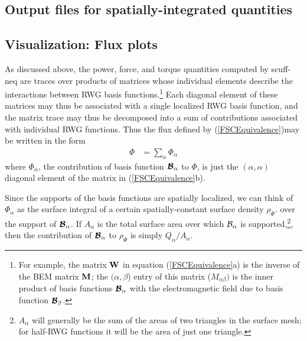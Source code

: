 \documentclass[letterpaper]{article}
\begin{document}
\newpage
\subsection{Output files for spatially-integrated quantities}

\subsection{Visualization: Flux plots}

As discussed above, the power, force, and torque quantities
computed by {\sc scuff-neq} are traces over products of matrices
whose individual elements describe the interactions between
RWG basis functions.\footnote{For example, the matrix $\mathbf{W}$ 
in equation (\ref{FSCEquivalence}a) is the inverse of the BEM matrix 
$\mathbf{M}$; the $(\alpha,\beta$) entry of this matrix 
($M_{\alpha\beta})$ is the inner product of basis functions 
$\boldsymbol{\mathcal{B}}_\alpha$ with the electromagnetic field due to basis
function $\boldsymbol{\mathcal{B}}_\beta$.} Each diagonal element of these
matrices may thus be associated with a single localized
RWG basis function, and the matrix trace may thus be
decomposed into a sum of contributions associated with 
individual RWG functions. Thus the flux defined
by (\ref{FSCEquivalence})may be written in the form 
\begin{align*}
 \Phi &= \sum_{\alpha} \Phi_{\alpha}
\end{align*}
where $\Phi_{\alpha}$, the contribution of basis function
$\boldsymbol{\mathcal{B}}_\alpha$ to $\Phi$, is just the $(\alpha,\alpha)$ 
diagonal element of the matrix in (\ref{FSCEquivalence}b).

Since the supports of the basis functions are spatially localized,
we can think of $\Phi_\alpha$ as the surface integral
of a certain spatially-constant surface density $\rho_\Phi.$
over the support of $\boldsymbol{\mathcal{B}}_\alpha$.
If $A_\alpha$ is the total surface area over which
$\mathcal{B}_\alpha$ is supported,\footnote{$A_\alpha$ will generally be
the sum of the areas of two triangles in the surface mesh;
for half-RWG functions it will be the area of just one
triangle.}, then the contribution of $\boldsymbol{\mathcal{B}}_\alpha$
to $\rho_\Phi$ is simply $Q_\alpha / A_\alpha$.
\end{document}
